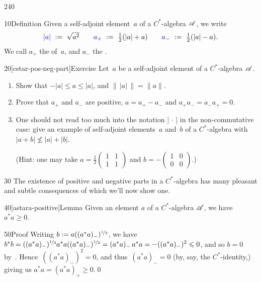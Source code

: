 \begin{parsec}{240}
\begin{point}{10}{Definition}
Given a self-adjoint element~$a$ of a $C^*$-algebra $\scrA$,
we write
\begin{equation*}
\textstyle
\Define{\left|a\right|}\ :=\ \sqrt{a^2}
\qquad
\Define{\pos{a}}\ :=\ \frac{1}{2}(\left|a\right| + a)
\qquad
\Define{a_{-}}\ :=\ \frac{1}{2}(\left|a\right| - a).
\end{equation*}%
We call $a_+$ the  of~$a$,
and $a_-$ the .
\end{point}
\begin{point}{20}[cstar-pos-neg-part]{Exercise}%
Let~$a$ be a self-adjoint element of a
 $C^*$-algebra $\scrA$.
\begin{enumerate}
\item
Show that $-\left|a\right| \leq a \leq \left| a \right|$,
and $\|\,\left|a\right|\,\|= \|a\|$.
\item
Prove that $a_+$ and $a_-$ are positive,  $a=a_+-a_-$
and $a_+a_-=a_-a_+=0$.
\item
One should not read too much into the notation
$\left|\,\cdot\,\right|$
in the non-commutative case:
give an example of
self-adjoint elements~$a$ and~$b$ of a $C^*$-algebra with
 $\left|a+b\right|\nleq \left|a\right|+ \left|b\right|$.

(Hint: one may take  
$a=\frac{1}{2}\left(\begin{smallmatrix}1 & 1 \\ 1 & 1\end{smallmatrix}\right)$
and $b=-\left(\begin{smallmatrix}1 & 0 \\ 0 & 0 \end{smallmatrix}\right)$.)
\end{enumerate}
\end{point}
\begin{point}{30}%
The existence of positive and negative parts
in a $C^*$-algebra
has many pleasant and subtle consequences
of which we'll now show one.
\end{point}
\begin{point}{40}[astara-positive]{Lemma}%
Given an element $a$ of a $C^*$-algebra $\scrA$,
we have $a^*a\geq 0$.
\begin{point}{50}{Proof}%
Writing $b:=a((a^*a)_-)^{\nicefrac{1}{2}}$,
we have $b^*b=
((a^*a)_-)^{\nicefrac{1}{2}} a^*a
((a^*a)_-)^{\nicefrac{1}{2}}
= (a^*a)_- \,a^*a
=
-((a^*a)_-)^2\leq 0$,
and so
$b=0$
by~.
    Hence~$((a^*a)_-)^2=0$,
    and thus~$(a^*a)_-=0$ (by, say, the $C^*$-identity,)
    giving us $a^*a=(a^*a)_+\geq 0$.\qed
\end{point}
\end{point}
\end{parsec}

